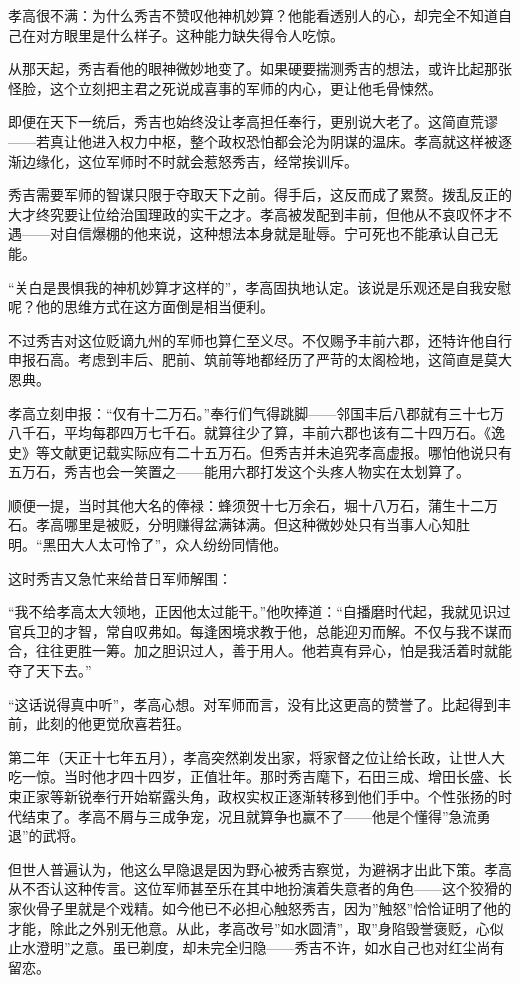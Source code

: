 \documentclass[
]{article}
\begin{document}
孝高很不满：为什么秀吉不赞叹他神机妙算？他能看透别人的心，却完全不知道自己在对方眼里是什么样子。这种能力缺失得令人吃惊。

从那天起，秀吉看他的眼神微妙地变了。如果硬要揣测秀吉的想法，或许比起那张怪脸，这个立刻把主君之死说成喜事的军师的内心，更让他毛骨悚然。

即便在天下一统后，秀吉也始终没让孝高担任奉行，更别说大老了。这简直荒谬------若真让他进入权力中枢，整个政权恐怕都会沦为阴谋的温床。孝高就这样被逐渐边缘化，这位军师时不时就会惹怒秀吉，经常挨训斥。

秀吉需要军师的智谋只限于夺取天下之前。得手后，这反而成了累赘。拨乱反正的大才终究要让位给治国理政的实干之才。孝高被发配到丰前，但他从不哀叹怀才不遇------对自信爆棚的他来说，这种想法本身就是耻辱。宁可死也不能承认自己无能。

``关白是畏惧我的神机妙算才这样的''，孝高固执地认定。该说是乐观还是自我安慰呢？他的思维方式在这方面倒是相当便利。

不过秀吉对这位贬谪九州的军师也算仁至义尽。不仅赐予丰前六郡，还特许他自行申报石高。考虑到丰后、肥前、筑前等地都经历了严苛的太阁检地，这简直是莫大恩典。

孝高立刻申报：``仅有十二万石。''奉行们气得跳脚------邻国丰后八郡就有三十七万八千石，平均每郡四万七千石。就算往少了算，丰前六郡也该有二十四万石。《逸史》等文献更记载实际应有二十五万石。但秀吉并未追究孝高虚报。哪怕他说只有五万石，秀吉也会一笑置之------能用六郡打发这个头疼人物实在太划算了。

顺便一提，当时其他大名的俸禄：蜂须贺十七万余石，堀十八万石，蒲生十二万石。孝高哪里是被贬，分明赚得盆满钵满。但这种微妙处只有当事人心知肚明。``黑田大人太可怜了''，众人纷纷同情他。

这时秀吉又急忙来给昔日军师解围：

``我不给孝高太大领地，正因他太过能干。''他吹捧道：``自播磨时代起，我就见识过官兵卫的才智，常自叹弗如。每逢困境求教于他，总能迎刃而解。不仅与我不谋而合，往往更胜一筹。加之胆识过人，善于用人。他若真有异心，怕是我活着时就能夺了天下去。''

``这话说得真中听''，孝高心想。对军师而言，没有比这更高的赞誉了。比起得到丰前，此刻的他更觉欣喜若狂。

第二年（天正十七年五月），孝高突然剃发出家，将家督之位让给长政，让世人大吃一惊。当时他才四十四岁，正值壮年。那时秀吉麾下，石田三成、增田长盛、长束正家等新锐奉行开始崭露头角，政权实权正逐渐转移到他们手中。个性张扬的时代结束了。孝高不屑与三成争宠，况且就算争也赢不了------他是个懂得''急流勇退''的武将。

但世人普遍认为，他这么早隐退是因为野心被秀吉察觉，为避祸才出此下策。孝高从不否认这种传言。这位军师甚至乐在其中地扮演着失意者的角色------这个狡猾的家伙骨子里就是个戏精。如今他已不必担心触怒秀吉，因为''触怒''恰恰证明了他的才能，除此之外别无他意。从此，孝高改号''如水圆清''，取''身陷毁誉褒贬，心似止水澄明''之意。虽已剃度，却未完全归隐------秀吉不许，如水自己也对红尘尚有留恋。
\end{document}
